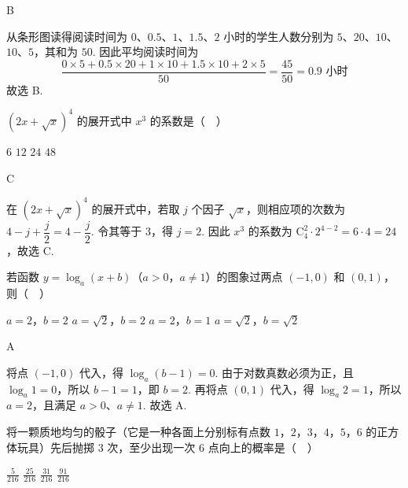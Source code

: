 \begin{answer}
B
\end{answer}

\begin{solution}
从条形图读得阅读时间为 \(0\)、\(0.5\)、\(1\)、\(1.5\)、\(2\) 小时的学生人数分别为 \(5\)、\(20\)、\(10\)、\(10\)、\(5\)，其和为 \(50\). 因此平均阅读时间为
\[
\frac{0\times5+0.5\times20+1\times10+1.5\times10+2\times5}{50}=\frac{45}{50}=0.9\text{ 小时}
\]
故选 B.
\end{solution}

\begin{problem}
\((2x + \sqrt{x})^4\) 的展开式中 \(x^3\) 的系数是（\(\quad\)）

\choices
    {\(6\)}
    {\(12\)}
    {\(24\)}
    {\(48\)}
\end{problem}

\begin{answer}
C
\end{answer}

\begin{solution}
在 \((2x+\sqrt{x})^4\) 的展开式中，若取 \(j\) 个因子 \(\sqrt{x}\)，则相应项的次数为 \(4-j+\dfrac j2=4-\dfrac j2\). 令其等于 \(3\)，得 \(j=2\). 因此 \(x^3\) 的系数为 \(\mathrm C_4^2\cdot2^{4-2}=6\cdot4=24\)，故选 C.
\end{solution}

\begin{problem}
若函数 \(y = \log_a (x + b)\)（\(a > 0\)，\(a \neq 1\)）的图象过两点 \((-1,0)\) 和 \((0,1)\)，则（\(\quad\)）

\choices
    {\(a = 2\)，\(b = 2\)}
    {\(a = \sqrt{2}\)，\(b = 2\)}
    {\(a = 2\)，\(b = 1\)}
    {\(a = \sqrt{2}\)，\(b = \sqrt{2}\)}
\end{problem}

\begin{answer}
A
\end{answer}

\begin{solution}
将点 \((-1,0)\) 代入，得 \(\log_a(b-1)=0\). 由于对数真数必须为正，且 \(\log_a1=0\)，所以 \(b-1=1\)，即 \(b=2\). 再将点 \((0,1)\) 代入，得 \(\log_a2=1\)，所以 \(a=2\)，且满足 \(a>0\)、\(a\ne1\). 故选 A.
\end{solution}

\begin{problem}
将一颗质地均匀的骰子（它是一种各面上分别标有点数 \(1\)，\(2\)，\(3\)，\(4\)，\(5\)，\(6\) 的正方体玩具）先后抛掷 \(3\) 次，至少出现一次 \(6\) 点向上的概率是（\(\quad\)）

\choices
    {\( \frac{5}{216} \)}
    {\( \frac{25}{216} \)}
    {\( \frac{31}{216} \)}
    {\( \frac{91}{216} \)}
\end{problem}

